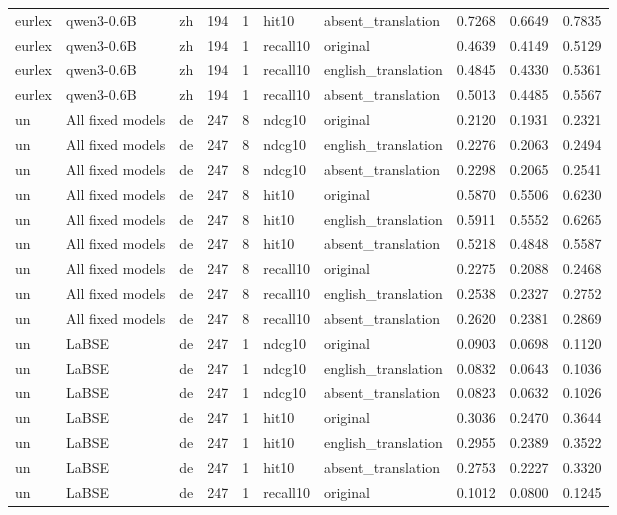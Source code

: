 \begin{tabular}{lllrrllrrr}
eurlex & qwen3-0.6B & zh & 194 & 1 & hit10 & absent\_translation & 0.7268 & 0.6649 & 0.7835 \\
eurlex & qwen3-0.6B & zh & 194 & 1 & recall10 & original & 0.4639 & 0.4149 & 0.5129 \\
eurlex & qwen3-0.6B & zh & 194 & 1 & recall10 & english\_translation & 0.4845 & 0.4330 & 0.5361 \\
eurlex & qwen3-0.6B & zh & 194 & 1 & recall10 & absent\_translation & 0.5013 & 0.4485 & 0.5567 \\
un & All fixed models & de & 247 & 8 & ndcg10 & original & 0.2120 & 0.1931 & 0.2321 \\
un & All fixed models & de & 247 & 8 & ndcg10 & english\_translation & 0.2276 & 0.2063 & 0.2494 \\
un & All fixed models & de & 247 & 8 & ndcg10 & absent\_translation & 0.2298 & 0.2065 & 0.2541 \\
un & All fixed models & de & 247 & 8 & hit10 & original & 0.5870 & 0.5506 & 0.6230 \\
un & All fixed models & de & 247 & 8 & hit10 & english\_translation & 0.5911 & 0.5552 & 0.6265 \\
un & All fixed models & de & 247 & 8 & hit10 & absent\_translation & 0.5218 & 0.4848 & 0.5587 \\
un & All fixed models & de & 247 & 8 & recall10 & original & 0.2275 & 0.2088 & 0.2468 \\
un & All fixed models & de & 247 & 8 & recall10 & english\_translation & 0.2538 & 0.2327 & 0.2752 \\
un & All fixed models & de & 247 & 8 & recall10 & absent\_translation & 0.2620 & 0.2381 & 0.2869 \\
un & LaBSE & de & 247 & 1 & ndcg10 & original & 0.0903 & 0.0698 & 0.1120 \\
un & LaBSE & de & 247 & 1 & ndcg10 & english\_translation & 0.0832 & 0.0643 & 0.1036 \\
un & LaBSE & de & 247 & 1 & ndcg10 & absent\_translation & 0.0823 & 0.0632 & 0.1026 \\
un & LaBSE & de & 247 & 1 & hit10 & original & 0.3036 & 0.2470 & 0.3644 \\
un & LaBSE & de & 247 & 1 & hit10 & english\_translation & 0.2955 & 0.2389 & 0.3522 \\
un & LaBSE & de & 247 & 1 & hit10 & absent\_translation & 0.2753 & 0.2227 & 0.3320 \\
un & LaBSE & de & 247 & 1 & recall10 & original & 0.1012 & 0.0800 & 0.1245 \\

\end{tabular}
